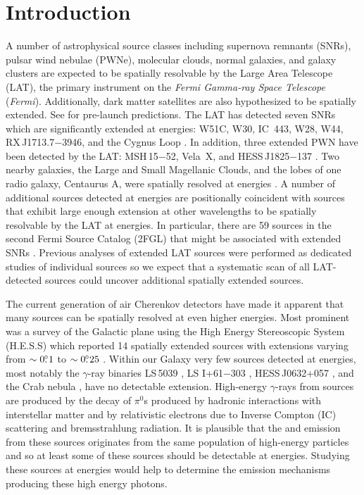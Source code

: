 \documentclass[12pt,preprint]{aastex}
\newcommand{\gev}{\text{GeV}\xspace}
\newcommand{\tev}{\text{TeV}\xspace}
\newcommand{\fermi}{\textit{Fermi}\xspace}
\begin{document}
\section{Introduction}

A number of astrophysical source classes including supernova remnants
(SNRs), pulsar wind nebulae (PWNe), molecular clouds, normal galaxies,
and galaxy clusters are expected to be spatially resolvable 
by the Large Area Telescope (LAT), the primary instrument on the {\em \fermi
Gamma-ray Space Telescope} (\fermi).
Additionally, dark matter satellites are also hypothesized to
be spatially extended. See \cite{atwood_fermi} for pre-launch predictions.
The LAT has
detected seven SNRs which are significantly extended
at \gev energies: 
W51C, W30, 
IC~443, W28, W44, RX\,J1713.7$-$3946,
and the Cygnus Loop
\citep{w51c,w30_lat,ic443,w28,w44,rx_j1713_lat,cygnus_loop_lat}. In addition, 
three extended PWN have been detected by the LAT: MSH\,15$-$52, Vela~X, and
HESS\,J1825$-$137 \citep{msh1552,velax,fermi_hess_j1825}. Two
nearby galaxies, the Large and Small Magellanic Clouds, 
and the lobes of one
radio galaxy, Centaurus A, were spatially resolved at \gev energies
\citep{lmc,smc,cen_a_lat}.  A number of additional sources detected
at \gev energies are positionally coincident with sources that exhibit
large enough extension at other wavelengths to be spatially
resolvable by the LAT at \gev energies.
In particular, there are 59 \gev sources in the second Fermi Source Catalog (2FGL)
that might be associated with extended SNRs \citep[2FGL,][]{second_cat}.
Previous analyses of extended LAT sources were performed as dedicated
studies of individual sources so we expect that a systematic scan of
all LAT-detected sources could uncover additional spatially extended
sources. 

The current generation of air Cherenkov detectors have
made it apparent that many sources can be spatially resolved
at even higher energies.
Most
prominent was a survey of the Galactic plane using the High Energy
Stereoscopic System (H.E.S.S) which reported 14 spatially extended
sources with extensions varying from $\sim0\mbox{$.\!\!^\circ$}1$ to $\sim0\mbox{$.\!\!^\circ$}25$
\citep{hess_plane_survey}.  Within our Galaxy very few
sources detected at \tev energies, most notably the $\gamma$-ray binaries
LS\,5039 \citep{HESSLS5039}, LS I+61$-$303 \citep{MAGICLSI, VERITASLSI},
HESS\,J0632+057 \citep{HESS0632}, and the Crab nebula \citep{crab_weekes},
have no detectable extension.  High-energy $\gamma$-rays from
\tev sources are produced by the decay of $\pi^0$s produced by hadronic
interactions with interstellar matter and by relativistic electrons
due to Inverse Compton (IC) scattering and bremsstrahlung radiation.  
It is plausible that the \gev and
\tev emission from these sources originates from the same population of
high-energy particles and so at least some of these sources should be
detectable at \gev energies.  Studying 
these \tev sources at \gev energies would help to
determine the emission mechanisms producing these high energy photons.
\end{document}
